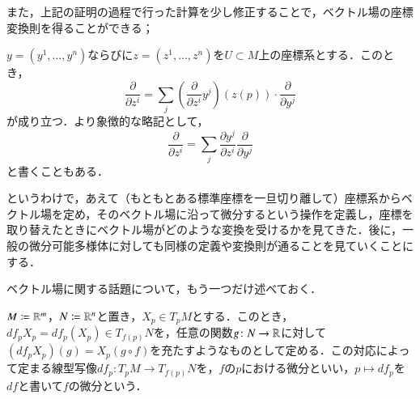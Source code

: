 また，上記の証明の過程で行った計算を少し修正することで，ベクトル場の座標変換則を得ることができる；

\begin{prop}
$y=(y^1, \dots, y^n)$ならびに$z = (z^1,\dots, z^n)$を$U \subset M$上の座標系とする．このとき，
\begin{equation}
\frac{\partial}{\partial z^i} = \sum_{j} \left( \frac{\partial }{\partial z^i} y^j \right) (z(p)) \cdot \frac{\partial}{\partial y^j}
\end{equation}が成り立つ．より象徴的な略記として，
\begin{equation}
\frac{\partial}{\partial z^i} = \sum_{j} \frac{\partial y^j}{\partial z^i} \frac{\partial}{\partial y^j}
\end{equation}と書くこともある．
\end{prop}

というわけで，あえて（もともとある標準座標を一旦切り離して）座標系からベクトル場を定め，そのベクトル場に沿って微分するという操作を定義し，座標を取り替えたときにベクトル場がどのような変換を受けるかを見てきた．後に，一般の微分可能多様体に対しても同様の定義や変換則が通ることを見ていくことにする．

ベクトル場に関する話題について，もう一つだけ述べておく．
\begin{defi}
$M \coloneqq \mathbb{R}^m$，$N \coloneqq \mathbb{R}^n$と置き，$X_p \in T_pM$とする．このとき，$df_p X_p = df_p (X_p) \in T_{f(p)}N$を，任意の関数$g \colon N \to \mathbb{R}$に対して$(df_pX_p)(g) = X_p(g \circ f)$を充たすようなものとして定める．この対応によって定まる線型写像$df_p \colon T_pM \to T_{f(p)}N$を，$f$の$p$における微分といい，$p \mapsto df_p$を$df$と書いて$f$の微分という．
\end{defi}


